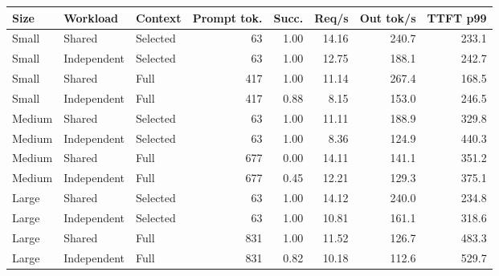 \begin{tabular}{lllrrrrr}
\toprule
Size & Workload & Context & Prompt tok. & Succ. & Req/s & Out tok/s & TTFT p99 \\
\midrule
Small & Shared & Selected & 63 & 1.00 & 14.16 & 240.7 & 233.1 \\
Small & Independent & Selected & 63 & 1.00 & 12.75 & 188.1 & 242.7 \\
Small & Shared & Full & 417 & 1.00 & 11.14 & 267.4 & 168.5 \\
Small & Independent & Full & 417 & 0.88 & 8.15 & 153.0 & 246.5 \\
Medium & Shared & Selected & 63 & 1.00 & 11.11 & 188.9 & 329.8 \\
Medium & Independent & Selected & 63 & 1.00 & 8.36 & 124.9 & 440.3 \\
Medium & Shared & Full & 677 & 0.00 & 14.11 & 141.1 & 351.2 \\
Medium & Independent & Full & 677 & 0.45 & 12.21 & 129.3 & 375.1 \\
Large & Shared & Selected & 63 & 1.00 & 14.12 & 240.0 & 234.8 \\
Large & Independent & Selected & 63 & 1.00 & 10.81 & 161.1 & 318.6 \\
Large & Shared & Full & 831 & 1.00 & 11.52 & 126.7 & 483.3 \\
Large & Independent & Full & 831 & 0.82 & 10.18 & 112.6 & 529.7 \\
\bottomrule
\end{tabular}

